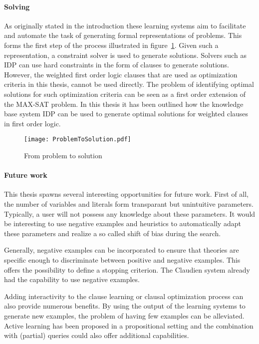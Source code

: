 \paragraph{Solving}
As originally stated in the introduction these learning systems aim to facilitate and automate the task of generating formal representations of problems.
This forms the first step of the process illustrated in figure~\ref{fig:problem_to_solution2}.
Given such a representation, a constraint solver is used to generate solutions.
Solvers such as IDP can use hard constraints in the form of clauses to generate solutions.
However, the weighted first order logic clauses that are used as optimization criteria in this thesis, cannot be used directly.
The problem of identifying optimal solutions for such optimization criteria can be seen as a first order extension of the MAX-SAT problem.
In this thesis it has been outlined how the knowledge base system IDP can be used to generate optimal solutions for weighted clauses in first order logic. 

\begin{figure}

	\caption{From problem to solution}
	\centering
		\texttt{[image: ProblemToSolution.pdf]}
	\label{fig:problem_to_solution2}

\end{figure}

\paragraph{Future work}
This thesis spawns several interesting opportunities for future work.
First of all, the number of variables and literals form transparant but unintuitive parameters.
Typically, a user will not possess any knowledge about these parameters.
It would be interesting to use negative examples and heuristics to automatically adapt these parameters and realize a so called shift of bias during the search.

Generally, negative examples can be incorporated to ensure that theories are specific enough to discriminate between positive and negative examples.
This offers the possibility to define a stopping criterion.
The Claudien system already had the capability to use negative examples.

Adding interactivity to the clause learning or clausal optimization process can also provide numerous benefits.
By using the output of the learning systems to generate new examples, the problem of having few examples can be alleviated.
Active learning has been proposed in a propositional setting \cite{campigotto2011active} and the combination with (partial) queries \cite{bessiere2013constraint,bessiere2007query} could also offer additional capabilities.

